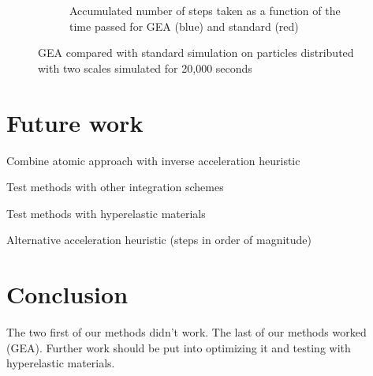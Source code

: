 \documentclass[11pt]{article}
\begin{document}
\begin{figure}
\begin{subfigure}[t]{0.5\textwidth}
        \caption{Accumulated number of steps taken as a function of the time passed for GEA
        (blue) and standard (red)}
        \label{fig:inverse_multiscale_cumstep}
    \end{subfigure}
    \caption{GEA compared with standard simulation on particles distributed with
        two scales simulated for 20,000 seconds}
    \label{fig:inverse_multiscale}
\end{figure}

%


\section{Future work}

Combine atomic approach with inverse acceleration heuristic

Test methods with other integration schemes

Test methods with hyperelastic materials

Alternative acceleration heuristic (steps in order of magnitude)


\section{Conclusion}

The two first of our methods didn't work. The last of our methods worked
(GEA). Further work should be put into optimizing it and testing with
hyperelastic materials.






\end{document}
